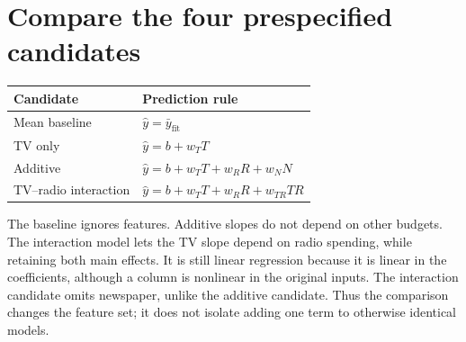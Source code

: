 \section{Compare the four prespecified candidates}
\begin{center}
\begin{tabular}{ll}\toprule
Candidate&Prediction rule\\\midrule
Mean baseline&$\hat y=\bar y_{\mathrm{fit}}$\\
TV only&$\hat y=b+w_TT$\\
Additive&$\hat y=b+w_TT+w_RR+w_NN$\\
TV--radio interaction&$\hat y=b+w_TT+w_RR+w_{TR}TR$\\\bottomrule
\end{tabular}
\end{center}
The baseline ignores features. Additive slopes do not depend on other budgets. The interaction model lets the TV slope depend on radio spending, while retaining both main effects. It is still linear regression because it is linear in the coefficients, although a column is nonlinear in the original inputs.
The interaction candidate omits newspaper, unlike the additive candidate. Thus the comparison changes the feature set; it does not isolate adding one term to otherwise identical models.

